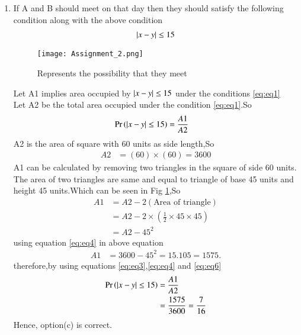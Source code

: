 \documentclass[journal,12pt,twocolumn]{IEEEtran}
\begin{document}
\begin{enumerate}
    \item 
    If A and B should meet on that day then they should satisfy the following condition along with the above condition
\begin{align}
    \vert x-y\vert\leq{15}
    \label{eq:eq2}
\end{align}    
\begin{figure}[ht]
    \centering
    \texttt{[image: Assignment\_2.png]}
    \caption{Represents the possibility that  they meet }
    \label{fig:graph1}
\end{figure}
Let A1 implies area occupied by $\vert x-y\vert\leq 15 $ under the conditions \eqref{eq:eq1}
\\
Let A2 be the total area occupied under the condition \eqref{eq:eq1}.So
\begin{align}
    \Pr\left(\vert x - y\vert\leq15\right)&=\frac{A1}{A2}
    \label{eq:eq3}
\end{align}
A2 is the area of square with 60 units as side length,So
\begin{align}
    A2&=(60)\times(60)=3600
    \label{eq:eq4}
\end{align}
A1 can be calculated by removing two triangles in the square of side 60 units. The area of two triangles are same and equal to 
triangle of base 45 units and height 45 units.Which can be seen in Fig \ref{fig:graph1},So
\begin{align}
    A1&=A2-2(\text{Area of triangle})
    \\
    &=A2-2\times(\frac{1}{2}\times45\times45)
    \\
    &=A2 -45^{2}
    \label{eq:eq5}
\end{align}
using equation \eqref{eq:eq4} in above equation
\begin{align}
    A1&=3600-45^{2}=15.105=1575 .
    \label{eq:eq6}
\end{align}
therefore,by using equations \eqref{eq:eq3},\eqref{eq:eq4} and \eqref{eq:eq6}
\begin{align}
    \Pr\left(\vert x - y\vert\leq15\right)&=\frac{A1}{A2}
    \\
    &=\frac{1575}{3600}=\frac{7}{16}
\end{align}
 Hence, option(c) is correct.
\end{enumerate}
\end{document}
